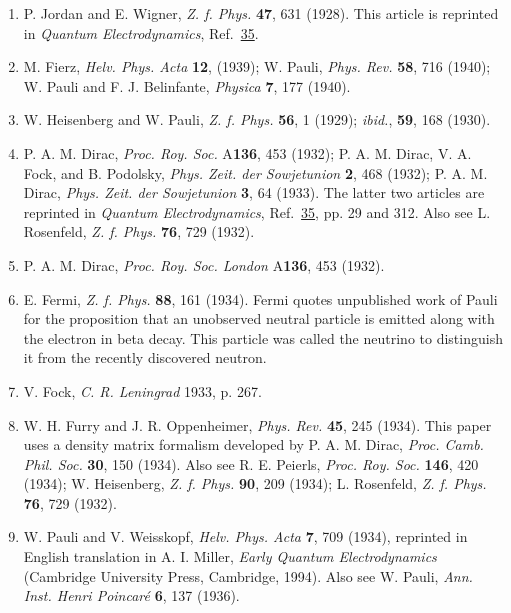 \begin{enumerate}
\item\label{ref:1.40} P. Jordan and E. Wigner, \emph{Z. f. Phys.} \textbf{47}, 631 (1928).
This article is reprinted in \emph{Quantum Electrodynamics}, Ref.~\hyperref[ref:1.35]{35}.

\item[40a.]\label{ref:1.40a} M. Fierz, \emph{Helv. Phys. Acta} \textbf{12}, (1939); W. Pauli,
\emph{Phys. Rev.} \textbf{58}, 716 (1940); W. Pauli and F. J. Belinfante,
\emph{Physica} \textbf{7}, 177 (1940).

\item\label{ref:1.41} W. Heisenberg and W. Pauli, \emph{Z. f. Phys.} \textbf{56}, 1 (1929);
\emph{ibid.}, \textbf{59}, 168 (1930).

\item\label{ref:1.42} P. A. M. Dirac, \emph{Proc. Roy. Soc.} A\textbf{136}, 453 (1932); P.
A. M. Dirac, V. A. Fock, and B. Podolsky, \emph{Phys. Zeit. der Sowjetunion}
\textbf{2}, 468 (1932); P. A. M. Dirac, \emph{Phys. Zeit. der Sowjetunion}
\textbf{3}, 64 (1933). The latter two articles are reprinted in \emph{Quantum
Electrodynamics}, Ref.~\hyperref[ref:1.35]{35}, pp. 29 and 312. Also see L. Rosenfeld, \emph{Z. f.
Phys.} \textbf{76}, 729 (1932).

\item[42a.]\label{ref:1.42a} P. A. M. Dirac, \emph{Proc. Roy. Soc. London} A\textbf{136}, 453
(1932).

\item\label{ref:1.43} E. Fermi, \emph{Z. f. Phys.} \textbf{88}, 161 (1934). Fermi quotes
unpublished work of Pauli for the proposition that an unobserved neutral
particle is emitted along with the electron in beta decay. This particle was
called the neutrino to distinguish it from the recently discovered neutron.

\item[43a.]\label{ref:1.43a} V. Fock, \emph{C. R. Leningrad} 1933, p. 267.

\item\label{ref:1.44} W. H. Furry and J. R. Oppenheimer, \emph{Phys. Rev.} \textbf{45}, 245
(1934). This paper uses a density matrix formalism developed by P. A. M.
Dirac, \emph{Proc. Camb. Phil. Soc.} \textbf{30}, 150 (1934). Also see R. E.
Peierls, \emph{Proc. Roy. Soc.} \textbf{146}, 420 (1934); W. Heisenberg,
\emph{Z. f. Phys.} \textbf{90}, 209 (1934); L. Rosenfeld, \emph{Z. f. Phys.}
\textbf{76}, 729 (1932).

\item\label{ref:1.45} W. Pauli and V. Weisskopf, \emph{Helv. Phys. Acta} \textbf{7}, 709
(1934), reprinted in English translation in A. I. Miller, \emph{Early Quantum
Electrodynamics} (Cambridge University Press, Cambridge, 1994). Also see W.
Pauli, \emph{Ann. Inst. Henri Poincar\'e} \textbf{6}, 137 (1936).


\end{enumerate}
